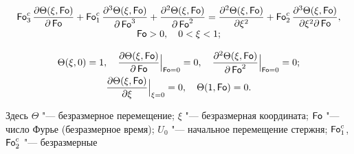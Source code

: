 \begin{equation}

\label{kud:eq29}

\begin{array}{c}

\displaystyle

\operatorname{\sf Fo}_3^c \frac{\partial  \Theta( \xi,\operatorname{\sf Fo})}{\partial

\operatorname{\sf Fo}}+

\operatorname{\sf Fo}_1^c \frac{\partial ^3 \Theta( \xi,\operatorname{\sf Fo})}{\partial \operatorname{\sf Fo}^3}+

\frac{\partial ^2 \Theta( \xi,\operatorname{\sf Fo})}{\partial \operatorname{\sf Fo}^2}

=\frac{\partial^2 \Theta( \xi,\operatorname{\sf Fo})}{\partial  \xi^2}+

\operatorname{\sf Fo}_2^c \frac{\partial^3 \Theta( \xi,\operatorname{\sf Fo})}{\partial  \xi^2\partial \operatorname{\sf Fo}}, \\[2mm]

\operatorname{\sf Fo}>0, \quad  0< \xi<1;

\end{array}

\end{equation}

\begin{gather}

\label{kud:eq30}

\Theta( \xi,0)=1,

\quad

\frac{\partial  \Theta( \xi,\operatorname{\sf Fo})}{\partial \operatorname{\sf Fo}}\Big|_{\operatorname{\sf Fo}=0}=0,

\quad

\frac{\partial^2 \Theta( \xi, \operatorname{\sf Fo})}{\partial \operatorname{\sf Fo}^2}\Big|_{\operatorname{\sf Fo}=0}=0;\\

\label{kud:eq31}

\frac{\partial  \Theta(\xi,\operatorname{\sf Fo})}{\partial  \xi}\Big|_{\xi=0}=0,

\quad

\Theta(1,\operatorname{\sf Fo})=0.

\end{gather}

Здесь $ \Theta$ "--- безразмерное перемещение; $ \xi $ "--- безразмерная координата; $\operatorname{\sf Fo}$ "--- число Фурье (безразмерное время); $U_0 $ "--- начальное перемещение стержня; $\operatorname{\sf Fo}_1^c$, $\operatorname{\sf Fo}_2^c$ "--- безразмерные

